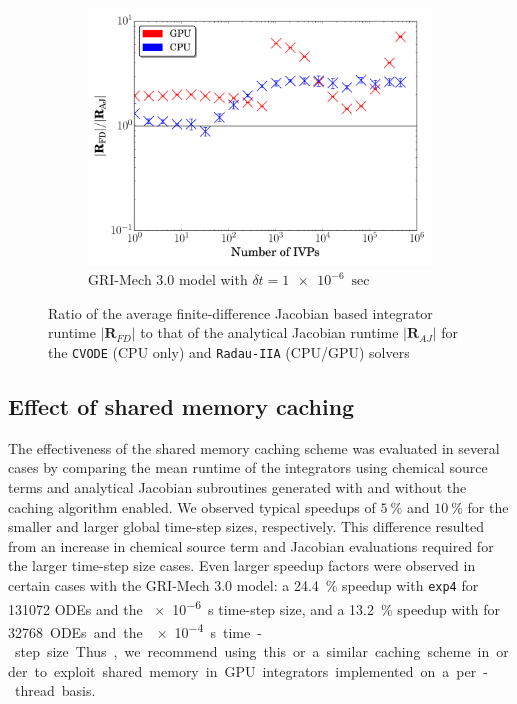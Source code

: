\documentclass[final,twocolumn]{elsarticle}
\begin{document}
\begin{figure}[htb]
  \\
  \begin{subfigure}{0.49\textwidth}
      \includegraphics[width=\linewidth]{CH4_1e-06_ajac_comp.pdf}
      \caption{GRI-Mech 3.0 model with $\delta t = \SI{1e-6}{\sec}$}
      \label{F:AJ_ch4_small}
  \end{subfigure}
  \caption{Ratio of the average finite-difference Jacobian based integrator runtime $\lvert\textbf{R}_{FD}\rvert$ to that of the analytical Jacobian runtime $\lvert\textbf{R}_{AJ}\rvert$ for the \texttt{CVODE} (CPU only) and \texttt{Radau-IIA} (CPU\slash GPU) solvers}
  \label{F:AJ_comp}
\end{figure}

\subsection{Effect of shared memory caching}
\label{S:smem}

The effectiveness of the shared memory caching scheme was evaluated in several cases by comparing the mean runtime of the integrators using chemical source terms and analytical Jacobian subroutines generated with and without the caching algorithm enabled.
We observed typical speedups of $\SI{5}{\percent}$ and $\SI{10}{\percent}$ for the smaller and larger global time-step sizes, respectively.
This difference resulted from an increase in chemical source term and Jacobian evaluations required for the larger time-step size cases.
Even larger speedup factors were observed in certain cases with the GRI-Mech 3.0 model: a \SI{24.4}{\percent} speedup with \texttt{exp4} for \num{131072} ODEs and the \SI{e-6}{\second} time-step size, and a \SI{13.2}{\percent} speedup with  for \SI{32768} ODEs and the \SI{e-4}{\second} time-step size.
Thus, we recommend using this or a similar caching scheme in order to exploit shared memory in GPU integrators implemented on a per-thread basis.
\end{document}
